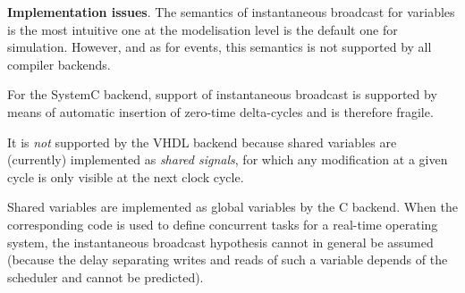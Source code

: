 \medskip \textbf{Implementation issues}.  
The semantics of instantaneous broadcast for variables is the most intuitive one at the modelisation
level is the default one for simulation. However, and as for events, this semantics is not supported
by all compiler backends. 

For the SystemC backend, support of instantaneous broadcast is supported by means of
automatic insertion of zero-time delta-cycles and is therefore fragile.

It is \emph{not} supported by the VHDL backend because shared variables are (currently)
implemented as \emph{shared signals}, for which any modification at a given cycle is only visible
at the next clock cycle. 

Shared variables are implemented as global variables by the C backend. When the
corresponding code is used to define concurrent tasks for a real-time operating system, the
instantaneous broadcast hypothesis cannot in general be assumed (because the delay separating writes
and reads of such a variable depends of the scheduler and cannot be predicted).

 


